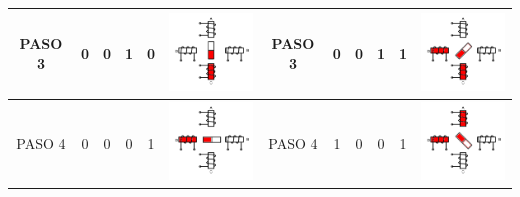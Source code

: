 \begin{table} [h!]
\begin{tabular}{|c|c|c|c|c|c|c|c|c|c|c|c|}
			PASO 3 & 0 & 0 & 1 & 0 & \includegraphics[width=33mm]{Imagenes/2/paso3} & PASO 3 & 0 & 0 & 1 & 1 &  \includegraphics[width=33mm]{Imagenes/2/paso3_5} \\ 
			\hline
			PASO 4 & 0 & 0 & 0 & 1 & \includegraphics[width=33mm]{Imagenes/2/paso4} & PASO 4 & 1 & 0 & 0 & 1 &  \includegraphics[width=33mm]{Imagenes/2/paso4_5} \\ 
			\hline
		\end{tabular} 
\end{table}


